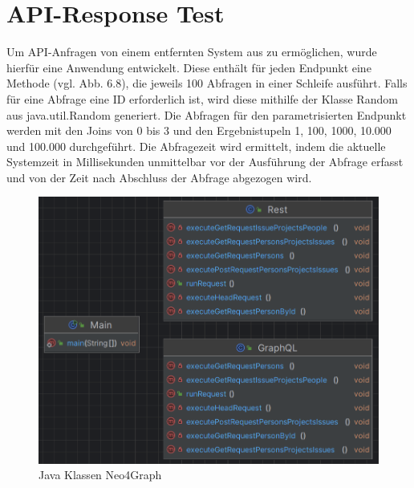 \section{API-Response Test} %
\label{sec:test}
Um API-Anfragen von einem entfernten System aus zu ermöglichen, wurde hierfür eine Anwendung entwickelt. Diese enthält für jeden Endpunkt eine Methode (vgl. Abb. 6.8), die jeweils 100 Abfragen in einer Schleife ausführt. Falls für eine Abfrage eine ID erforderlich ist, wird diese mithilfe der Klasse Random aus java.util.Random generiert. Die Abfragen für den parametrisierten Endpunkt werden mit den Joins von 0 bis 3 und den Ergebnistupeln 1, 100, 1000, 10.000 und 100.000 durchgeführt. Die Abfragezeit wird ermittelt, indem die aktuelle Systemzeit in Millisekunden unmittelbar vor der Ausführung der Abfrage erfasst und von der Zeit nach Abschluss der Abfrage abgezogen wird.
\begin{figure}[H]
	\centering
	\includegraphics[scale=0.5]{Illustrations/apiresponsetest.png}
	\caption{Java Klassen Neo4Graph}
\end{figure}
